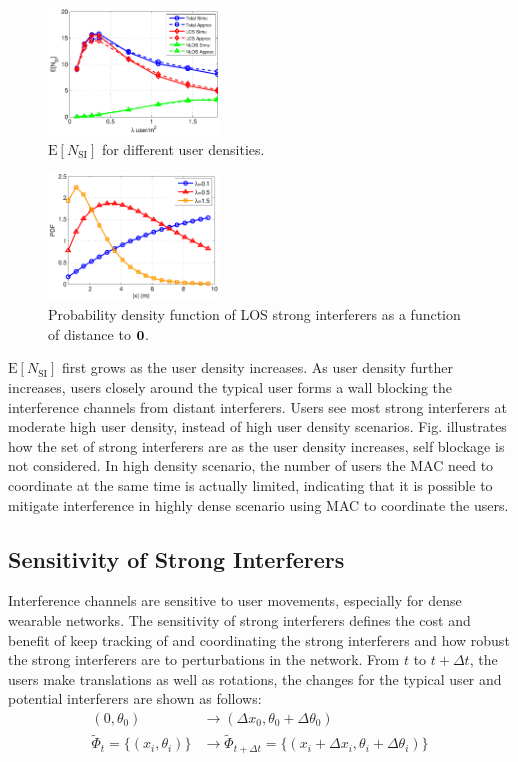 \documentclass[10pt, conference, letterpaper]{IEEEtran}
\begin{document}
\begin{figure}
	\centering
	\includegraphics[width = 0.4\textwidth]{Channel_en_si.pdf}
	\caption{$\mathrm{E}[N_{\mathrm{SI}}]$ for different user densities.}
	\label{fig:Channel_en_si}
\end{figure}


\begin{figure}
	\centering
	\includegraphics[width = 0.4\textwidth]{Channel_si_pdf.pdf}
	\caption{Probability density function of LOS strong interferers as a function of distance to $\bf{0}$.}
	\label{fig:Channel_si_pdf}
\end{figure}

$\mathrm{E}[N_{\mathrm{SI}}]$ first grows as the user density increases. As user density further increases, users closely around the typical user forms a wall blocking the interference channels from distant interferers. Users see most strong interferers at moderate high user density, instead of high user density scenarios. Fig.  illustrates how the set of strong interferers are as the user density increases, self blockage is not considered. In high density scenario, the number of users the MAC need to coordinate at the same time is actually limited, indicating that it is possible to mitigate interference in highly dense scenario using MAC to coordinate the users.

\subsection{Sensitivity of Strong Interferers}
Interference channels are sensitive to user movements, especially for dense wearable networks. The sensitivity of strong interferers defines the cost and benefit of keep tracking of and coordinating the strong interferers and how robust the strong interferers are to perturbations in the network. From $t$ to $t+\Delta t$, the users make translations as well as rotations, the changes for the typical user and potential interferers are shown as follows:
\begin{equation*}
\begin{split}
(0,\theta_0)&\rightarrow(\Delta x_0, \theta_0 + \Delta\theta_0) \\
\tilde{\Phi}_{t}=\{(x_i, \theta_i)\}&\rightarrow\tilde{\Phi}_{t+\Delta t}=\{(x_i+\Delta x_i, \theta_i + \Delta\theta_i)\}
\end{split}
\end{equation*}
\end{document}
